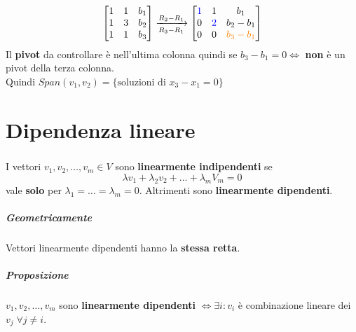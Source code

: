 \documentclass[a4paper, 12pt]{report}
\begin{document}
\begin{enumerate}
                            $$
                            \begin{bmatrix}
                                1 & 1 & b_1\\
                                1 & 3 & b_2\\
                                1 & 1 & b_3
                            \end{bmatrix}
                            \xrightarrow[R_3-R_1]{R_2-R_1}
                            \begin{bmatrix}
                                \textcolor{blue}{1} & 1 & b_1\\
                                0 & \textcolor{blue}{2} & b_2-b_1\\
                                0 & 0 & \textcolor{orange}{b_3-b_1}
                            \end{bmatrix}
                            $$
                            Il \textbf{pivot} da controllare è nell'ultima colonna quindi se $b_3-b_1=0 \Leftrightarrow$ \textbf{non} è un pivot della terza colonna.\\
                            Quindi $Span(v_1,v_2)=\{\text{soluzioni di }x_3-x_1=0\}$
                    \end{enumerate}
    \chapter{Dipendenza lineare}
            \paragraph{}I vettori $v_1,v_2,\dots,v_m \in V$ sono \textbf{linearmente indipendenti} se
            $$\lambda v_1+\lambda_2 v_2+\dots+\lambda_m V_m = 0$$ vale \textbf{solo} per $\lambda_1=\dots=\lambda_m=0$.
            Altrimenti sono \textbf{linearmente dipendenti}.
            \paragraph{Geometricamente} Vettori linearmente dipendenti hanno la \textbf{stessa retta}.
            \paragraph{Proposizione} $v_1,v_2,\dots,v_m$ sono \textbf{linearmente dipendenti} $\Leftrightarrow \exists i : v_i$ è combinazione lineare dei $v_j\; \forall j\neq i$.
\end{document}
